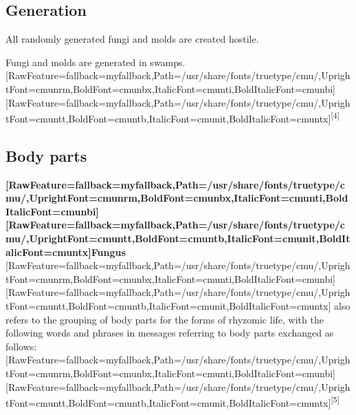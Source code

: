 \subsection{Generation}
\label{4}
All randomly generated fungi and molds are created hostile.


Fungi and molds are generated in swamps\footnotemark[47].\allowbreak{}\setmainfont{cmunrm.ttf}[RawFeature={fallback=myfallback},Path=/usr/share/fonts/truetype/cmu/,UprightFont=cmunrm,BoldFont=cmunbx,ItalicFont=cmunti,BoldItalicFont=cmunbi]\setmonofont{cmunrm.ttf}[RawFeature={fallback=myfallback},Path=/usr/share/fonts/truetype/cmu/,UprightFont=cmuntt,BoldFont=cmuntb,ItalicFont=cmunit,BoldItalicFont=cmuntx]\textsuperscript{{$\text{[}$}4{$\text{]}$}}



\subsection{Body parts}
\label{5}
{\bfseries \allowbreak{}\setmainfont{cmunbx.ttf}[RawFeature={fallback=myfallback},Path=/usr/share/fonts/truetype/cmu/,UprightFont=cmunrm,BoldFont=cmunbx,ItalicFont=cmunti,BoldItalicFont=cmunbi]\setmonofont{cmunbx.ttf}[RawFeature={fallback=myfallback},Path=/usr/share/fonts/truetype/cmu/,UprightFont=cmuntt,BoldFont=cmuntb,ItalicFont=cmunit,BoldItalicFont=cmuntx]\bfseries Fungus}{$\text{ }$}\allowbreak{}\setmainfont{cmunrm.ttf}[RawFeature={fallback=myfallback},Path=/usr/share/fonts/truetype/cmu/,UprightFont=cmunrm,BoldFont=cmunbx,ItalicFont=cmunti,BoldItalicFont=cmunbi]\setmonofont{cmunrm.ttf}[RawFeature={fallback=myfallback},Path=/usr/share/fonts/truetype/cmu/,UprightFont=cmuntt,BoldFont=cmuntb,ItalicFont=cmunit,BoldItalicFont=cmuntx] also refers to the grouping of body parts\footnotemark[48] for the forms of rhyzomic life, with the following words and phrases in messages referring to body parts exchanged as follows:\allowbreak{}\setmainfont{cmunrm.ttf}[RawFeature={fallback=myfallback},Path=/usr/share/fonts/truetype/cmu/,UprightFont=cmunrm,BoldFont=cmunbx,ItalicFont=cmunti,BoldItalicFont=cmunbi]\setmonofont{cmunrm.ttf}[RawFeature={fallback=myfallback},Path=/usr/share/fonts/truetype/cmu/,UprightFont=cmuntt,BoldFont=cmuntb,ItalicFont=cmunit,BoldItalicFont=cmuntx]\textsuperscript{{$\text{[}$}5{$\text{]}$}}




